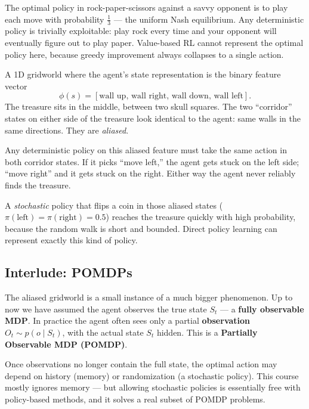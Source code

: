 \documentclass[11pt, oneside]{book}
\begin{document}
\begin{exbox}[title={Rock--Paper--Scissors}]
The optimal policy in rock-paper-scissors against a savvy opponent is to play each
move with probability $\tfrac{1}{3}$ --- the uniform Nash equilibrium.
Any deterministic policy is trivially exploitable: play rock every time and your
opponent will eventually figure out to play paper.
Value-based RL cannot represent the optimal policy here, because greedy improvement
always collapses to a single action.
\end{exbox}

\begin{exbox}[title={Aliased Gridworld}]
A 1D gridworld where the agent's state representation is the binary feature vector
\[
  \phi(s) = [\text{wall up},\, \text{wall right},\, \text{wall down},\, \text{wall left}].
\]
The treasure sits in the middle, between two skull squares.
The two ``corridor'' states on either side of the treasure look identical to the
agent: same walls in the same directions. They are \emph{aliased}.

Any deterministic policy on this aliased feature must take the same action in both
corridor states. If it picks ``move left,'' the agent gets stuck on the left side;
``move right'' and it gets stuck on the right. Either way the agent never reliably
finds the treasure.

A \emph{stochastic} policy that flips a coin in those aliased states ($\pi(\text{left}) =
\pi(\text{right}) = 0.5$) reaches the treasure quickly with high probability,
because the random walk is short and bounded. Direct policy learning can represent
exactly this kind of policy.
\end{exbox}

\subsection{Interlude: POMDPs}

The aliased gridworld is a small instance of a much bigger phenomenon.
Up to now we have assumed the agent observes the true state $S_t$ --- a
\textbf{fully observable MDP}.
In practice the agent often sees only a partial \textbf{observation}
$O_t \sim p(o \mid S_t)$, with the actual state $S_t$ hidden.
This is a \textbf{Partially Observable MDP (POMDP)}.

Once observations no longer contain the full state, the optimal action may depend
on history (memory) or randomization (a stochastic policy).
This course mostly ignores memory --- but allowing stochastic policies is essentially
free with policy-based methods, and it solves a real subset of POMDP problems.
\end{document}
